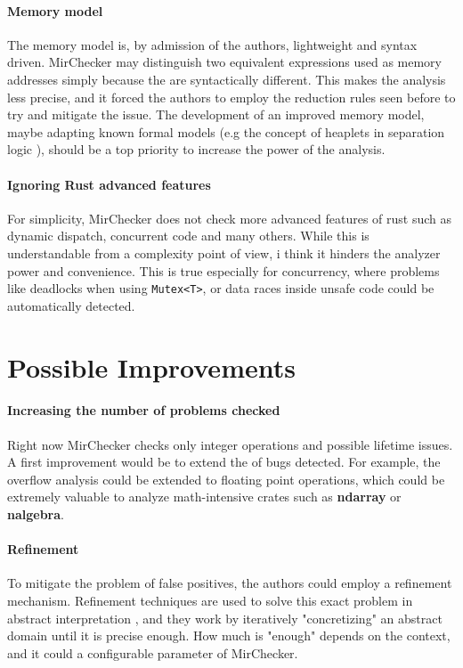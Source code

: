 \documentclass{article}
\begin{document}
\paragraph*{Memory model}
The memory model is, by admission of the authors, lightweight and syntax driven. MirChecker may distinguish 
two  equivalent expressions used as memory addresses simply because the are syntactically different. This makes the analysis 
less precise, and it forced the authors to employ the reduction rules seen before to try and mitigate the issue. The development of an improved
memory model, maybe adapting known formal models  (e.g the concept of heaplets in separation logic \cite{o2019separation}), should be a top priority to  
increase the power of the analysis.

\paragraph*{Ignoring Rust advanced features}
For simplicity, MirChecker does not check more advanced features of rust such as dynamic dispatch, concurrent code and many others. While 
this is understandable from a complexity point of view, i think it hinders the analyzer power and convenience. This is true especially for concurrency, 
where problems like deadlocks when using \texttt{Mutex<T>}, or data races inside unsafe code could be automatically detected.

\section*{Possible Improvements}

\paragraph*{Increasing the number of problems checked}
Right now MirChecker checks only integer operations and possible lifetime issues. 
A first improvement would be to extend the  of bugs detected. For example, the overflow 
analysis could be extended to floating point operations, which could be extremely valuable 
to analyze math-intensive crates such as \textbf{ndarray} or \textbf{nalgebra}.

\paragraph*{Refinement}
To mitigate the problem of false positives, the authors could employ a refinement mechanism. Refinement techniques are used to solve 
this exact problem in abstract interpretation \cite{gulavani2006counterexample}\cite{bogomolov2017counterexample}, and they work by iteratively "concretizing" an abstract domain  until it is precise enough. 
How much is "enough" depends on the context, and it could a configurable parameter of MirChecker.
\end{document}
